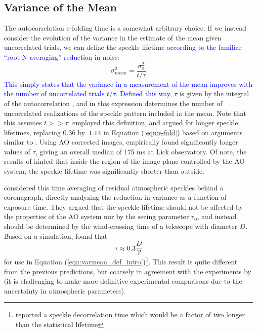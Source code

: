 \documentclass[10pt,preprint]{aastex631}
\newcommand{\jrmadd}[1]{\textcolor{blue}{#1}}
\begin{document}
\subsection{Variance of the Mean}
The autocorrelation e-folding time is a somewhat arbitrary choice.  If we instead consider the evolution of the variance in the estimate of the mean given uncorrelated trials, we can define the speckle lifetime \jrmadd{according to the familiar ``root-N averaging'' reduction in noise:}
\begin{equation}
\sigma_{mean}^2 = \frac{\sigma_o^2}{t/\tau}
\label{eqn:varmean_def_intro}
\end{equation}
\jrmadd{This simply states that the variance in a measurement of the mean improves with the number of uncorrelated trials $t/\tau$.  Defined this way,} $\tau$ is given by the integral of the autocorrelation \citep{2006ApJ...637..541F}, and in this expression determines the number of uncorrelated realizations of the speckle pattern included in the mean.  Note that this assumes $t >> \tau$.  \citet{1986JOSAA...3.1001A} employed this definition, and argued for longer speckle lifetimes, replacing $0.36$ by $~$$1.14$ in Equation (\ref{eqn:e-fold}) based on arguments similar to \citet{1982JOpt...13..263R}.  Using AO corrected images, \citet{2006ApJ...637..541F} empirically found significantly longer values of $\tau$, giving an overall median of 175 ms at Lick observatory.  Of note, the results of \citet{2006ApJ...637..541F} hinted that inside the region of the image plane controlled by the AO system, the speckle lifetime was significantly shorter than outside.

\citet{2005SPIE.5903..170M} considered this time averaging of residual atmospheric speckles behind a coronagraph, directly analyzing the reduction in variance as a function of exposure time.  They argued that the speckle lifetime should not be affected by the properties of the AO system nor by the seeing parameter $r_0$, and instead should be determined by the wind-crossing time of a telescope with diameter $D$.  Based on a simulation, \citet{2005SPIE.5903..170M} found that 
\begin{equation}
\tau \approx 0.3 \frac{D}{\mathcal{V}}
\end{equation}
for use in Equation (\ref{eqn:varmean_def_intro})\footnote{\citet{2005SPIE.5903..170M} reported a speckle decorrelation time which would be a factor of two longer than the statistical lifetime}.  This result is quite different from the previous predictions, but coarsely in agreement with the experiments by \citet{2006ApJ...637..541F} (it is challenging to make more definitive experimental comparisons due to the uncertainty in atmospheric parameters).
\end{document}
